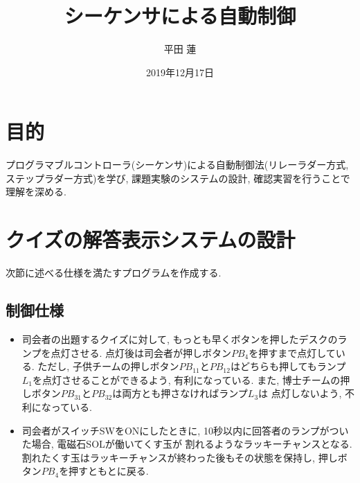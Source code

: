 \documentclass[titlepage]{jsarticle}
\title{シーケンサによる自動制御}
\author{平田 蓮}
\date{2019年12月17日}
\begin{document}
\maketitle
\section{目的}
  プログラマブルコントローラ(シーケンサ)による自動制御法(リレーラダー方式, ステップラダー方式)を学び, 課題実験のシステムの設計, 確認実習を行うことで理解を深める.
\section{クイズの解答表示システムの設計}
  次節に述べる仕様を満たすプログラムを作成する.
  \subsection{制御仕様}
    \begin{itemize}
      \item 司会者の出題するクイズに対して, もっとも早くボタンを押したデスクのランプを点灯させる.
        点灯後は司会者が押しボタン$PB_4$を押すまで点灯している.
        ただし, 子供チームの押しボタン$PB_{11}$と$PB_{12}$はどちらも押してもランプ$L_1$を点灯させることができるよう,
        有利になっている. また, 博士チームの押しボタン$PB_{31}$と$PB_{32}$は両方とも押さなければランプ$L_3$は
        点灯しないよう, 不利になっている.
      \item 司会者がスイッチSWをONにしたときに, 10秒以内に回答者のランプがついた場合, 電磁石SOLが働いてくす玉が
        割れるようなラッキーチャンスとなる.
        割れたくす玉はラッキーチャンスが終わった後もその状態を保持し, 押しボタン$PB_4$を押すともとに戻る.
    \end{itemize}
\end{document}
